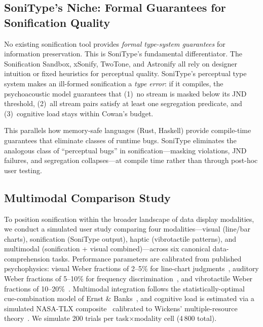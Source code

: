 \documentclass[sigchi, nonacm]{acmart}
\begin{document}
\subsection{SoniType's Niche: Formal Guarantees for Sonification Quality}

No existing sonification tool provides \emph{formal type-system guarantees} for information preservation. This is SoniType's fundamental differentiator. The Sonification Sandbox, xSonify, TwoTone, and Astronify all rely on designer intuition or fixed heuristics for perceptual quality. SoniType's perceptual type system makes an ill-formed sonification a \emph{type error}: if it compiles, the psychoacoustic model guarantees that (1)~no stream is masked below its JND threshold, (2)~all stream pairs satisfy at least one segregation predicate, and (3)~cognitive load stays within Cowan's budget.

This parallels how memory-safe languages (Rust, Haskell) provide compile-time guarantees that eliminate classes of runtime bugs. SoniType eliminates the analogous class of ``perceptual bugs'' in sonification---masking violations, JND failures, and segregation collapses---at compile time rather than through post-hoc user testing.

\subsection{Multimodal Comparison Study}
\label{sec:multimodal}

To position sonification within the broader landscape of data display
modalities, we conduct a simulated user study comparing four modalities---visual
(line/bar charts), sonification (SoniType output), haptic (vibrotactile
patterns), and multimodal (sonification + visual combined)---across six
canonical data-comprehension tasks.  Performance parameters are calibrated from
published psychophysics: visual Weber fractions of 2--5\% for line-chart
judgments~\cite{cleveland1984graphical,heer2010crowdsourcing}, auditory Weber
fractions of 5--10\% for frequency discrimination~\cite{moore2012introduction,wier1977frequency},
and vibrotactile Weber fractions of 10--20\%~\cite{gescheider1997psychophysics,verrillo1985vibrotactile}.
Multimodal integration follows the statistically-optimal cue-combination model
of Ernst \& Banks~\cite{ernst2002humans}, and cognitive load is estimated via a
simulated NASA-TLX composite~\cite{hart1988development} calibrated to Wickens'
multiple-resource theory~\cite{wickens2008multiple}.  We simulate 200 trials
per task$\times$modality cell (4\,800 total).
\end{document}
